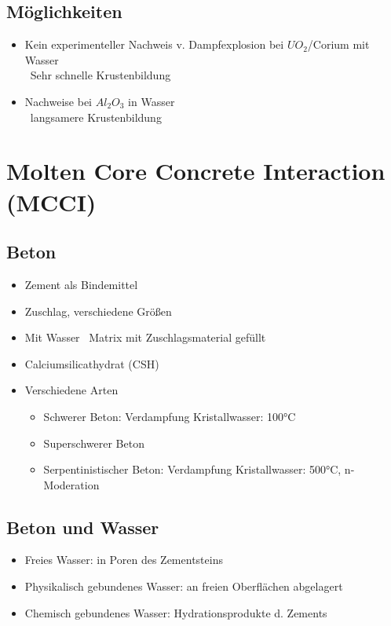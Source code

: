 \documentclass[12pt]{article}
\begin{document}
\subsection{Möglichkeiten}
\begin{itemize}[noitemsep]
	\item Kein experimenteller Nachweis v. Dampfexplosion bei \(UO_2\)/Corium mit Wasser\\
		\textrightarrow\ Sehr schnelle Krustenbildung
	\item Nachweise bei \(Al_2O_3\) in Wasser\\
		\textrightarrow\ langsamere Krustenbildung
\end{itemize}

\section{Molten Core Concrete Interaction (MCCI)}

\subsection{Beton}
\begin{itemize}[noitemsep]
	\item Zement als Bindemittel
	\item Zuschlag, verschiedene Größen
	\item Mit Wasser \textrightarrow\ Matrix mit Zuschlagsmaterial gefüllt
	\item Calciumsilicathydrat (CSH)
	\item Verschiedene Arten
		\begin{itemize}[noitemsep]
			\item Schwerer Beton: Verdampfung Kristallwasser: 100°C
			\item Superschwerer Beton
			\item Serpentinistischer Beton: Verdampfung Kristallwasser: 500°C, n-Moderation
		\end{itemize}
\end{itemize}

\subsection{Beton und Wasser}
\begin{itemize}[noitemsep]
	\item Freies Wasser: in Poren des Zementsteins
	\item Physikalisch gebundenes Wasser: an freien Oberflächen abgelagert
	\item Chemisch gebundenes Wasser: Hydrationsprodukte d. Zements
\end{itemize}
\end{document}
